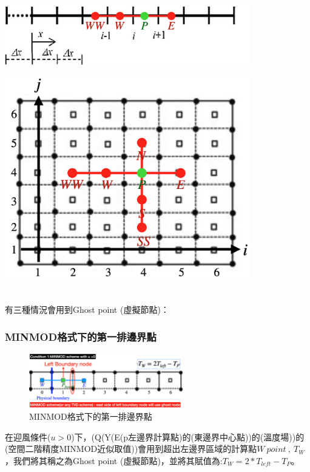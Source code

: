 \documentclass[12pt]{article}
\begin{document}
\noindent
\begin{minipage}[t]{0.48\textwidth}
    \centering
    \includegraphics[width=0.8\textwidth]{31.png}
    \label{fig:1D-4point-stencil-1}
\end{minipage}
\hfill
\begin{minipage}[t]{0.48\textwidth}
    \centering
    \includegraphics[width=0.8\textwidth]{30.png}
    \label{fig:2D-8point-stencil}
\end{minipage}\\[1.5ex]
\noindent 有三種情況會用到Ghost point (虛擬節點)：
\subsubsection{MINMOD格式下的第一排邊界點}
\begin{figure}[H]
    \centering
    \includegraphics[width=0.6\textwidth]{33.png}
    \caption{\footnotesize MINMOD格式下的第一排邊界點}
    \label{fig:MINMOD格式下的第一排邊界點}
\end{figure}
\noindent 在迎風條件($u>0$)下，(Q(Y(E(p左邊界計算點)的(東邊界中心點))的(溫度場))的(空間二階精度MINMOD近似取值))會用到超出左邊界區域的計算點$W\ point\ ,\ T_{W}$，我們將其稱之為Ghost point (虛擬節點)，並將其賦值為:$T_{W} = 2*T_{left} - T_{P}$。
\end{document}
